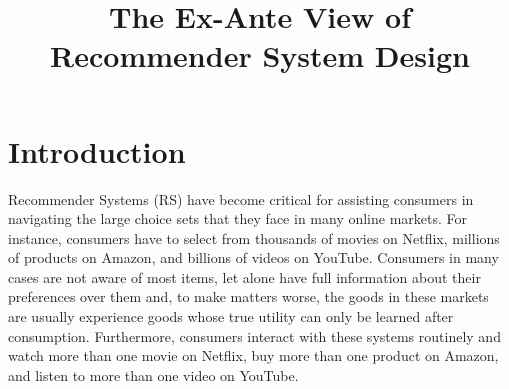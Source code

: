 \documentclass[sigconf]{acmart}
\begin{document}

%
\title{The Ex-Ante View of Recommender System Design}
%

%
\begin{abstract}
\end{abstract}

%
%

%

%

\maketitle

\section{Introduction}

Recommender Systems (RS) have become critical for assisting consumers in navigating the large choice sets that they face in many online markets. For instance, consumers have to select from thousands of movies on Netflix, millions of products on Amazon, and billions of videos on YouTube. Consumers in many cases are not aware of most items, let alone have full information about their preferences over them and, to make matters worse, the goods in these markets are usually experience goods whose true utility can only be learned after consumption. Furthermore, consumers interact with these systems routinely and watch more than one movie on Netflix, buy more than one product on Amazon, and listen to more than one video on YouTube.
\end{document}
